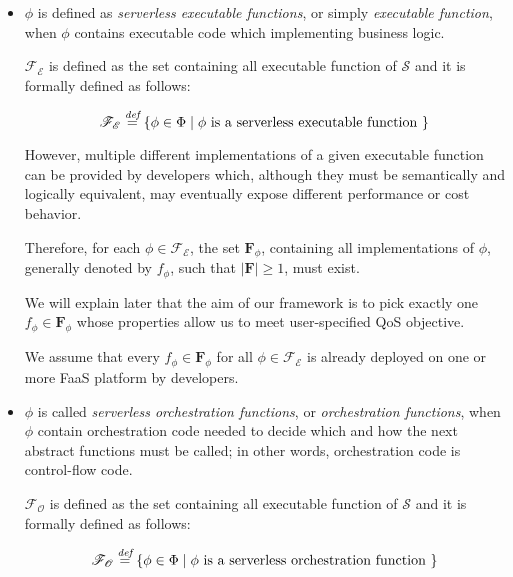 \begin{itemize}
	
	\item $\phi$ is defined as \textit{serverless executable functions}, or simply \textit{executable function}, when $\phi$ contains executable code which implementing business logic.
	
	$\mathscr{F_E}$ is defined as the set containing all executable function of $\mathcal{S}$ and it is formally defined as follows:
	
	\begin{equation}
		\mathscr{F_E} \overset{\textit{def}}{=} \left\lbrace \phi \in \Phi \mid \phi \text{ is a serverless executable function }\right\rbrace 
	\end{equation}
	
	However, multiple different implementations of a given executable function can be provided by developers which, although they must be semantically and logically equivalent, may eventually expose different performance or cost behavior. 
	
	Therefore, for each $\phi \in \mathscr{F_E}$, the set $\textbf{F}_{\phi}$, containing all implementations of $\phi$, generally denoted by $f_{\phi}$, such that $|\textbf{F}| \geq 1 $, must exist.

	We will explain later that the aim of our framework is to pick exactly one $f_{\phi} \in \textbf{F}_{\phi}$ whose properties allow us to meet user-specified QoS objective.
	
	We assume that every $f_{\phi} \in \textbf{F}_{\phi}$ for all $\phi \in \mathscr{F_E}$ is already deployed on one or more FaaS platform by developers.
		
	\item $\phi$ is called \textit{serverless orchestration functions}, or \textit{orchestration functions}, when $\phi$ contain orchestration code needed to decide which and how the next abstract functions must be called; in other words, orchestration code is control-flow code.
	
	$\mathscr{F_O}$ is defined as the set containing all executable function of $\mathcal{S}$ and it is formally defined as follows:
	
	\begin{equation}
		\mathscr{F_O} \overset{\textit{def}}{=} \left\lbrace \phi \in \Phi \mid \phi \text{ is a serverless orchestration function }\right\rbrace 
	\end{equation}

	
\end{itemize}

